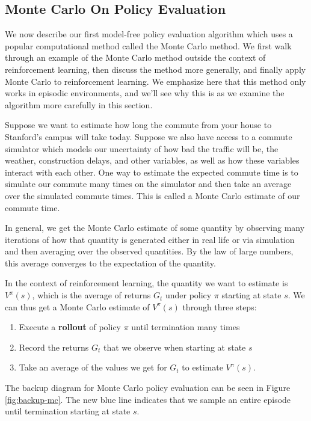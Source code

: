 \documentclass{article}
\begin{document}
\subsection{Monte Carlo On Policy Evaluation}

We now describe our first model-free policy evaluation algorithm which uses a popular computational method called the Monte Carlo method.  We first walk through an example of the Monte Carlo method outside the context of reinforcement learning, then discuss the method more generally, and finally apply Monte Carlo to reinforcement learning.  We emphasize here that this method only works in episodic environments, and we'll see why this is as we examine the algorithm more carefully in this section.

Suppose we want to estimate how long the commute from your house to Stanford's campus will take today.  Suppose we also have access to a commute simulator which models our uncertainty of how bad the traffic will be, the weather, construction delays, and other variables, as well as how these variables interact with each other.  One way to estimate the expected commute time is to simulate our commute many times on the simulator and then take an average over the simulated commute times.  This is called a Monte Carlo estimate of our commute time.

In general, we get the Monte Carlo estimate of some quantity by observing many iterations of how that quantity is generated either in real life or via simulation and then averaging over the observed quantities.  By the law of large numbers, this average converges to the expectation of the quantity.

In the context of reinforcement learning, the quantity we want to estimate is $V^\pi(s)$, which is the average of returns $G_t$ under policy $\pi$ starting at state $s$.  We can thus get a Monte Carlo estimate of $V^\pi(s)$ through three steps:
\begin{enumerate}[noitemsep,partopsep=0pt,topsep=0pt,parsep=0pt]
\item Execute a \textbf{rollout} of policy $\pi$ until termination many times
\item Record the returns $G_t$ that we observe when starting at state $s$
\item Take an average of the values we get for $G_t$ to estimate $V^\pi(s)$.
\end{enumerate}

The backup diagram for Monte Carlo policy evaluation can be seen in Figure \ref{fig:backup-mc}.  The new blue line indicates that we sample an entire episode until termination starting at state $s$.
\end{document}
